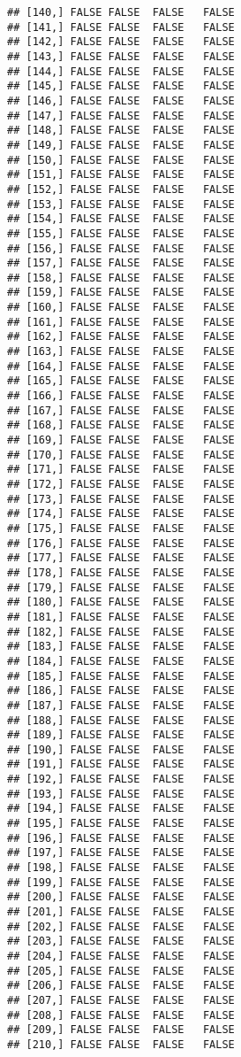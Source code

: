 \documentclass[
]{article}
\begin{document}
\begin{verbatim}
## [140,] FALSE FALSE  FALSE   FALSE
## [141,] FALSE FALSE  FALSE   FALSE
## [142,] FALSE FALSE  FALSE   FALSE
## [143,] FALSE FALSE  FALSE   FALSE
## [144,] FALSE FALSE  FALSE   FALSE
## [145,] FALSE FALSE  FALSE   FALSE
## [146,] FALSE FALSE  FALSE   FALSE
## [147,] FALSE FALSE  FALSE   FALSE
## [148,] FALSE FALSE  FALSE   FALSE
## [149,] FALSE FALSE  FALSE   FALSE
## [150,] FALSE FALSE  FALSE   FALSE
## [151,] FALSE FALSE  FALSE   FALSE
## [152,] FALSE FALSE  FALSE   FALSE
## [153,] FALSE FALSE  FALSE   FALSE
## [154,] FALSE FALSE  FALSE   FALSE
## [155,] FALSE FALSE  FALSE   FALSE
## [156,] FALSE FALSE  FALSE   FALSE
## [157,] FALSE FALSE  FALSE   FALSE
## [158,] FALSE FALSE  FALSE   FALSE
## [159,] FALSE FALSE  FALSE   FALSE
## [160,] FALSE FALSE  FALSE   FALSE
## [161,] FALSE FALSE  FALSE   FALSE
## [162,] FALSE FALSE  FALSE   FALSE
## [163,] FALSE FALSE  FALSE   FALSE
## [164,] FALSE FALSE  FALSE   FALSE
## [165,] FALSE FALSE  FALSE   FALSE
## [166,] FALSE FALSE  FALSE   FALSE
## [167,] FALSE FALSE  FALSE   FALSE
## [168,] FALSE FALSE  FALSE   FALSE
## [169,] FALSE FALSE  FALSE   FALSE
## [170,] FALSE FALSE  FALSE   FALSE
## [171,] FALSE FALSE  FALSE   FALSE
## [172,] FALSE FALSE  FALSE   FALSE
## [173,] FALSE FALSE  FALSE   FALSE
## [174,] FALSE FALSE  FALSE   FALSE
## [175,] FALSE FALSE  FALSE   FALSE
## [176,] FALSE FALSE  FALSE   FALSE
## [177,] FALSE FALSE  FALSE   FALSE
## [178,] FALSE FALSE  FALSE   FALSE
## [179,] FALSE FALSE  FALSE   FALSE
## [180,] FALSE FALSE  FALSE   FALSE
## [181,] FALSE FALSE  FALSE   FALSE
## [182,] FALSE FALSE  FALSE   FALSE
## [183,] FALSE FALSE  FALSE   FALSE
## [184,] FALSE FALSE  FALSE   FALSE
## [185,] FALSE FALSE  FALSE   FALSE
## [186,] FALSE FALSE  FALSE   FALSE
## [187,] FALSE FALSE  FALSE   FALSE
## [188,] FALSE FALSE  FALSE   FALSE
## [189,] FALSE FALSE  FALSE   FALSE
## [190,] FALSE FALSE  FALSE   FALSE
## [191,] FALSE FALSE  FALSE   FALSE
## [192,] FALSE FALSE  FALSE   FALSE
## [193,] FALSE FALSE  FALSE   FALSE
## [194,] FALSE FALSE  FALSE   FALSE
## [195,] FALSE FALSE  FALSE   FALSE
## [196,] FALSE FALSE  FALSE   FALSE
## [197,] FALSE FALSE  FALSE   FALSE
## [198,] FALSE FALSE  FALSE   FALSE
## [199,] FALSE FALSE  FALSE   FALSE
## [200,] FALSE FALSE  FALSE   FALSE
## [201,] FALSE FALSE  FALSE   FALSE
## [202,] FALSE FALSE  FALSE   FALSE
## [203,] FALSE FALSE  FALSE   FALSE
## [204,] FALSE FALSE  FALSE   FALSE
## [205,] FALSE FALSE  FALSE   FALSE
## [206,] FALSE FALSE  FALSE   FALSE
## [207,] FALSE FALSE  FALSE   FALSE
## [208,] FALSE FALSE  FALSE   FALSE
## [209,] FALSE FALSE  FALSE   FALSE
## [210,] FALSE FALSE  FALSE   FALSE

\end{verbatim}
\end{document}
